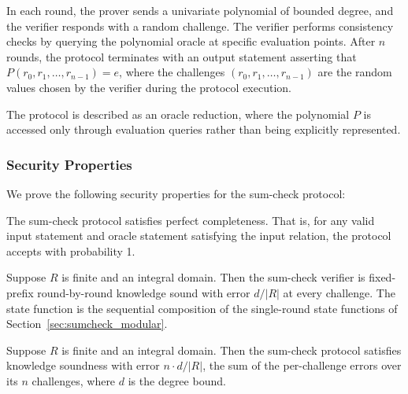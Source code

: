 In each round, the prover sends a univariate polynomial of bounded degree, and the verifier responds with a random challenge. The verifier performs consistency checks by querying the polynomial oracle at specific evaluation points. After $n$ rounds, the protocol terminates with an output statement asserting that $P(r_0, r_1, \ldots, r_{n-1}) = e$, where the challenges $(r_0, r_1, \ldots, r_{n-1})$ are the random values chosen by the verifier during the protocol execution.

The protocol is described as an oracle reduction, where the polynomial $P$ is accessed only through evaluation queries rather than being explicitly represented.

\subsubsection{Security Properties}

We prove the following security properties for the sum-check protocol:

\begin{theorem}
    \label{thm:sumcheck_perfect_completeness}
    \leanok
    The sum-check protocol satisfies perfect completeness. That is, for any valid input statement and oracle statement satisfying the input relation, the protocol accepts with probability 1.
\end{theorem}

\begin{theorem}
    \label{thm:sumcheck_rbr_knowledge_soundness_standard}
    \leanok
    Suppose $R$ is finite and an integral domain. Then the sum-check verifier is fixed-prefix round-by-round knowledge sound with error $d / |R|$ at every challenge. The state function is the sequential composition of the single-round state functions of Section~\ref{sec:sumcheck_modular}.
\end{theorem}

\begin{theorem}
    \label{thm:sumcheck_knowledge_soundness}
    \leanok
    Suppose $R$ is finite and an integral domain. Then the sum-check protocol satisfies knowledge soundness with error $n \cdot d / |R|$, the sum of the per-challenge errors over its $n$ challenges, where $d$ is the degree bound.
\end{theorem}

